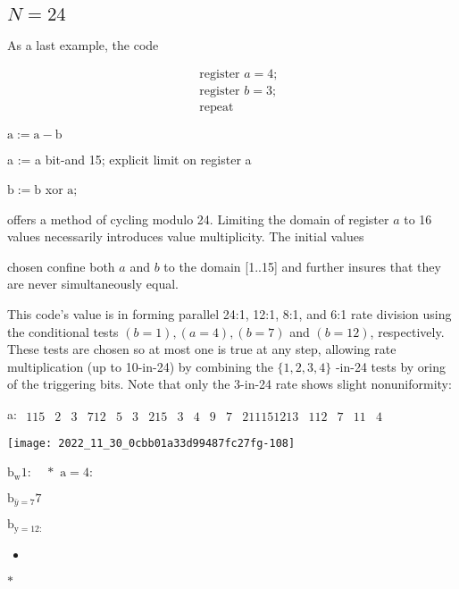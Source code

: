 \begin{CJK}{UTF8}{gbsn}
\subsection*{$
N=24
$}

As a last example, the code

$$
\begin{aligned}
&\text { register } a=4 ; \\
&\text { register } b=3 ; \\
&\text { repeat }
\end{aligned}
$$

$\mathrm{a}:=\mathrm{a}-\mathrm{b}$

a := a bit-and 15; explicit limit on register a

$\mathrm{b}:=\mathrm{b}$ xor $\mathrm{a} ;$

offers a method of cycling modulo 24. Limiting the domain of register $a$ to 16 values necessarily introduces value multiplicity. The initial values

chosen confine both $a$ and $b$ to the domain [1..15] and further insures that they are never simultaneously equal.

This code's value is in forming parallel 24:1, 12:1, 8:1, and 6:1 rate division using the conditional tests $(b=1),(a=4),(b=7)$ and $(b=12)$, respectively. These tests are chosen so at most one is true at any step, allowing rate multiplication (up to 10-in-24) by combining the $\{1,2,3,4\}$ -in-24 tests by oring of the triggering bits. Note that only the 3-in-24 rate shows slight nonuniformity:

a: $\begin{array}{llllllllllllllll}115 & 2 & 3 & 712 & 5 & 3 & 215 & 3 & 4 & 9 & 7 & 211151213 & 112 & 7 & 11 & 4\end{array}$

\begin{center}
\texttt{[image: 2022\_11\_30\_0cbb01a33d99487fc27fg-108]}
\end{center}

$\mathrm{b}_{\text {w}} 1: \quad *$
$\mathrm{a}=4:$

$\mathrm{b}_{\bar{y}=7} 7$

$\mathrm{b}_{\mathrm{y}=12:}$

\begin{itemize}
  \item 
\end{itemize}

$*$


\end{CJK}
